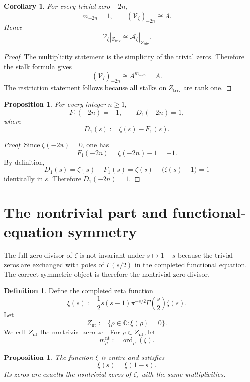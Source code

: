 \documentclass[11pt,a4paper]{article}
\newtheorem{proposition}[theorem]{Proposition}
\newtheorem{corollary}[theorem]{Corollary}
\theoremstyle{definition}
\newtheorem{definition}[theorem]{Definition}
\theoremstyle{remark}
\DeclareMathOperator{\ord}{ord}
\newcommand{\CC}{\mathbb C}
\begin{document}
\begin{corollary}
For every trivial zero \(-2n\),
\[
m_{-2n}=1,
\qquad
(\mathcal V_\zeta)_{-2n}\cong A.
\]
Hence
\[
\mathcal V_\zeta|_{Z_{\mathrm{triv}}}\cong \mathcal A_\zeta|_{Z_{\mathrm{triv}}}.
\]
\end{corollary}

\begin{proof}
The multiplicity statement is the simplicity of the trivial zeros. Therefore the stalk formula gives
\[
(\mathcal V_\zeta)_{-2n}\cong A^{m_{-2n}}=A.
\]
The restriction statement follows because all stalks on \(Z_{\mathrm{triv}}\) are rank one.
\end{proof}

\begin{proposition}
For every integer \(n\ge1\),
\[
F_1(-2n)=-1,
\qquad
D_1(-2n)=1,
\]
where
\[
D_1(s):=\zeta(s)-F_1(s).
\]
\end{proposition}

\begin{proof}
Since \(\zeta(-2n)=0\), one has
\[
F_1(-2n)=\zeta(-2n)-1=-1.
\]
By definition,
\[
D_1(s)=\zeta(s)-F_1(s)=\zeta(s)-\bigl(\zeta(s)-1\bigr)=1
\]
identically in \(s\). Therefore \(D_1(-2n)=1\).
\end{proof}

\section{The nontrivial part and functional-equation symmetry}

The full zero divisor of \(\zeta\) is not invariant under \(s\mapsto1-s\) because the trivial zeros are exchanged with poles of \(\Gamma(s/2)\) in the completed functional equation. The correct symmetric object is therefore the nontrivial zero divisor.

\begin{definition}
Define the completed zeta function
\[
\xi(s):=\frac12 s(s-1)\pi^{-s/2}\Gamma\left(\frac{s}{2}\right)\zeta(s).
\]
Let
\[
Z_{\mathrm{nt}}:=\{\rho\in\CC:\xi(\rho)=0\}.
\]
We call \(Z_{\mathrm{nt}}\) the nontrivial zero set. For \(\rho\in Z_{\mathrm{nt}}\), let
\[
m^{\mathrm{nt}}_\rho:=\ord_\rho(\xi).
\]
\end{definition}

\begin{proposition}
The function \(\xi\) is entire and satisfies
\[
\xi(s)=\xi(1-s).
\]
Its zeros are exactly the nontrivial zeros of \(\zeta\), with the same multiplicities.
\end{proposition}
\end{document}
